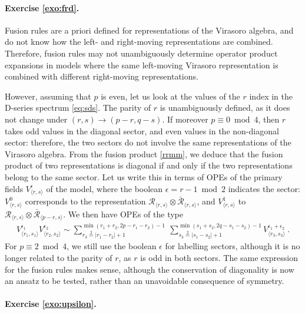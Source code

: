 \documentclass[12pt, a4paper]{article}
\theoremstyle{break}
\begin{document}
\paragraph{Exercise \ref{exo:frd}.}

Fusion rules are a priori defined for representations of the Virasoro algebra, and do not know how the left- and right-moving representations are combined. Therefore, fusion rules may not unambiguously determine operator product expansions in models where the same left-moving Virasoro representation is combined with different right-moving representations. 

However, assuming that $p$ is even, let us look at the values of the $r$ index in the D-series spectrum \eqref{eq:sds}. The parity of $r$ is unambiguously defined, as it does not change under $(r,s)\to (p-r,q-s)$. If moreover $p\equiv 0 \bmod 4$, then $r$ takes odd values in the diagonal sector, and even values in the non-diagonal sector: therefore, the two sectors do not involve the same representations of the Virasoro algebra. From the fusion product \eqref{rrmm}, we deduce that the fusion product of two representations is diagonal if and only if the two representations belong to the same sector. Let us write this in terms of OPEs of the primary fields $V^\epsilon_{\langle r,s\rangle}$ of the model, where the boolean $\epsilon = r-1\bmod 2$ indicates the sector: $V^0_{\langle r,s\rangle}$ corresponds to the representation $\mathcal{R}_{ \langle r,s\rangle} \otimes \bar{\mathcal{R}}_{\langle r,s\rangle}$, and $V^1_{\langle r,s\rangle}$ to $\mathcal{R}_{\langle r,s\rangle} \otimes \bar{\mathcal{R}}_{\langle p-r,s\rangle}$. We then have OPEs of the type 
\begin{align}
 V^{\epsilon_1}_{\langle r_1,s_1\rangle}V^{\epsilon_2}_{\langle r_2,s_2\rangle} \sim \sum_{r_3\overset{2}{=}|r_1-r_2|+1}^{\min(r_1+r_2,2p-r_1-r_2)-1}\ \sum_{s_3\overset{2}{=}|s_1-s_2|+1}^{\min(s_1+s_2,2q-s_1-s_2)-1} V^{\epsilon_1+\epsilon_2}_{\langle r_3,s_3\rangle}\ .
\end{align}
For $p\equiv 2\bmod 4$, we still use the boolean $\epsilon$ for labelling sectors, although it is no longer related to the parity of $r$, as $r$ is odd in both sectors. The same expression for the fusion rules makes sense, although the conservation of diagonality is now an ansatz to be tested, rather than an unavoidable consequence of symmetry.


\paragraph{Exercise \ref{exo:upsilon}.}
\end{document}
